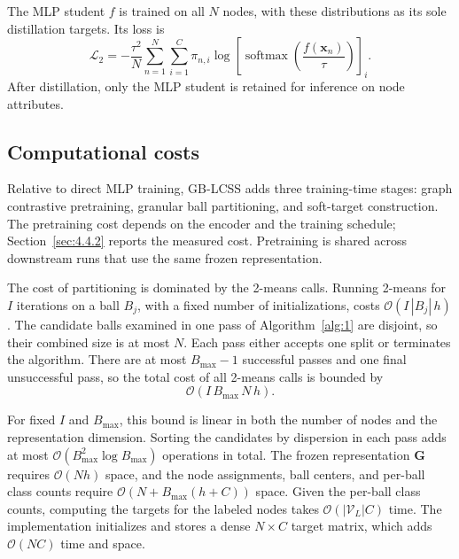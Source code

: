 \documentclass[times,review,10pt]{elsarticle}
\theoremstyle{definition}
\theoremstyle{plain}
\begin{document}
The MLP student \(f\) is trained on all \(N\) nodes, with these distributions as its sole distillation targets. Its loss is
\begin{equation}\label{eq:21}
\mathcal L_2=-\frac{\tau^2}{N}\sum_{n=1}^{N}\sum_{i=1}^C\pi_{n,i}
\log\left[\operatorname{softmax}\left(\frac{f(\mathbf x_n)}{\tau}\right)\right]_i.
\end{equation}
After distillation, only the MLP student is retained for inference on node attributes.

\subsection{Computational costs}\label{sec:3.6}

Relative to direct MLP training, GB-LCSS adds three training-time stages: graph contrastive pretraining, granular ball partitioning, and soft-target construction. The pretraining cost depends on the encoder and the training schedule; Section~\ref{sec:4.4.2} reports the measured cost. Pretraining is shared across downstream runs that use the same frozen representation.


The cost of partitioning is dominated by the 2-means calls. Running 2-means for \(I\) iterations on a ball \(B_j\), with a fixed number of initializations, costs \(\mathcal{O}(I\,|B_j|\,h)\). The candidate balls examined in one pass of Algorithm~\ref{alg:1} are disjoint, so their combined size is at most \(N\). Each pass either accepts one split or terminates the algorithm. There are at most \(B_{\max}-1\) successful passes and one final unsuccessful pass, so the total cost of all 2-means calls is bounded by
\begin{equation}\label{eq:22}
\mathcal{O}(I\,B_{\max}\,N\,h).
\end{equation}

For fixed \(I\) and \(B_{\max}\), this bound is linear in both the number of nodes and the representation dimension. Sorting the candidates by dispersion in each pass adds at most \(\mathcal{O}(B_{\max}^{2}\log B_{\max})\) operations in total. The frozen representation \(\mathbf G\) requires \(\mathcal{O}(Nh)\) space, and the node assignments, ball centers, and per-ball class counts require \(\mathcal{O}(N + B_{\max}(h + C))\) space. Given the per-ball class counts, computing the targets for the labeled nodes takes \(\mathcal{O}(|\mathcal{V}_{L}|C)\) time. The implementation initializes and stores a dense \(N \times C\) target matrix, which adds \(\mathcal{O}(NC)\) time and space.
\end{document}

